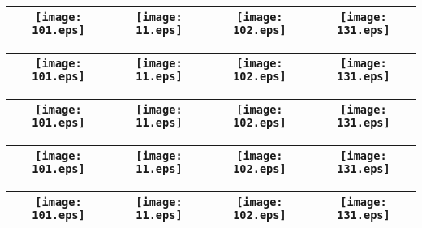 \begin{table}[ht!]
\centering
{}
\graphicspath{{../../IbexJobs/ibex_lambdas_20191104/Simulations_TEST/Simulation_20180302_\arabic{j}/}}
\begin{tabular}{ccccc}
\toprule
\multicolumn{2}{c}{\texttt{[image: 101.eps]}} & \texttt{[image: 11.eps]} & \texttt{[image: 102.eps]} & \texttt{[image: 131.eps]}\\
\bottomrule
\end{tabular}
\graphicspath{{../../IbexJobs/ibex_lambdas_20191104/Simulations_TEST/Simulation_20180302_\arabic{j}/}}
\begin{tabular}{ccccc}
\toprule
\multicolumn{2}{c}{\texttt{[image: 101.eps]}} & \texttt{[image: 11.eps]} & \texttt{[image: 102.eps]} & \texttt{[image: 131.eps]}\\
\bottomrule
\end{tabular}
\graphicspath{{../../IbexJobs/ibex_lambdas_20191104/Simulations_TEST/Simulation_20180302_\arabic{j}/}}
\begin{tabular}{ccccc}
\toprule
\multicolumn{2}{c}{\texttt{[image: 101.eps]}} & \texttt{[image: 11.eps]} & \texttt{[image: 102.eps]} & \texttt{[image: 131.eps]}\\
\bottomrule
\end{tabular}
\graphicspath{{../../IbexJobs/ibex_lambdas_20191104/Simulations_TEST/Simulation_20180302_\arabic{j}/}}
\begin{tabular}{ccccc}
\toprule
\multicolumn{2}{c}{\texttt{[image: 101.eps]}} & \texttt{[image: 11.eps]} & \texttt{[image: 102.eps]} & \texttt{[image: 131.eps]}\\
\bottomrule
\end{tabular}
\graphicspath{{../../IbexJobs/ibex_lambdas_20191104/Simulations_TEST/Simulation_20180302_\arabic{j}/}}
\begin{tabular}{ccccc}
\toprule
\multicolumn{2}{c}{\texttt{[image: 101.eps]}} & \texttt{[image: 11.eps]} & \texttt{[image: 102.eps]} & \texttt{[image: 131.eps]}\\
\bottomrule
\end{tabular}
\graphicspath{{../../IbexJobs/ibex_lambdas_20191104/Simulations_TEST/Simulation_20180302_\arabic{j}/}}

\end{table}
